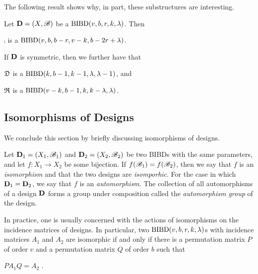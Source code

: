 \documentclass[../../../main]{subfiles}
\begin{document}
The following result shows why, in part, these substructures are interesting.

\begin{prop}\label{res-der-params}
 Let $\mathbf{D}=(X,\mathscr{B})$ be a $\text{BIBD}(v,b,r,k,\lambda)$. Then
 \begin{defenum}
  \item\label{comp-parameters} $\comp$ is a $\text{BIBD}(v,b,b-r,v-k,b-2r+\lambda)$.
 \end{defenum}
 If $\mathbf{D}$ is symmetric, then we further have that
 \begin{defenum}[resume]
  \item\label{der-parameters} $\mathfrak{D}$ is a $\text{BIBD}(k,b-1,k-1,\lambda,\lambda-1)$, and 
  \item\label{res-parameters} $\mathfrak{R}$ is a $\text{BIBD}(v-k,b-1,k,k-\lambda,\lambda)$.
 \end{defenum}
\end{prop}

\dinkus


\subsection{Isomorphisms of Designs}

We conclude this section by briefly discussing isomorphisms of designs. 

\begin{defin}\label{isomorphisms}
 Let $\mathbf{D}_1=(X_1,\mathscr{B}_1)$ and $\mathbf{D}_2=(X_2,\mathscr{B}_2)$ be two BIBDs with the same parameters, and let $f: X_1 \rightarrow X_2$ be some bijection. If $f(\mathscr{B}_1) = f(\mathscr{B}_2)$, then we say that $f$ is an {\it isomorphism} and that the two designs are {\it isomporhic}. For the case in which $\mathbf{D}_1 = \mathbf{D}_2$, we say that $f$ is an {\it automorphism}. The collection of all automorphisms of a design $\mathbf{D}$ forms a group under composition called the {\it automorphism group} of the design.

In practice, one is usually concerned with the actions of isomorphisms on the incidence matrices of designs. In particular, two $\text{BIBD}(v,b,r,k,\lambda)$s with incidence matrices $A_1$ and $A_2$ are isomorphic if and only if there is a permutation matrix $P$ of order $v$ and a permutation matrix $Q$ of order $b$ such that 
\begin{defenum}
\item\label{binary-equiv} $PA_1Q = A_2$ .
\end{defenum}
\end{defin}
\end{document}
